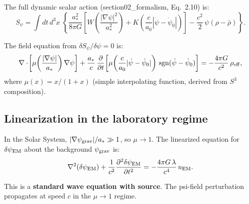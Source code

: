 \documentclass[11pt]{article}
\newcommand{\psigrav}{\psi_{\rm grav}}
\newcommand{\dpsiEM}{\delta\psi_{\rm EM}}
\theoremstyle{definition}
\theoremstyle{remark}
\begin{document}
The full dynamic scalar action (section02\_formalism, Eq.~2.10) is:
\begin{equation}
S_\psi = \int dt\,d^3x\;\left\{
  \frac{a_*^2}{8\pi G}\left[
    W\!\left(\frac{|\nabla\psi|^2}{a_*^2}\right)
    + K\!\left(\frac{c}{a_0}|\dot\psi{-}\dot\psi_0|\right)
  \right]
  - \frac{c^2}{2}\,\psi(\rho - \bar\rho)
\right\}.
\label{eq:action_full}
\end{equation}

The field equation from $\delta S_\psi/\delta\psi = 0$ is:
\begin{equation}
\nabla\cdot\!\left[\mu\!\left(\frac{|\nabla\psi|}{a_*}\right)
\nabla\psi\right]
+ \frac{a_*}{c}\,\frac{\partial}{\partial t}\!\left[
\mu\!\left(\frac{c}{a_0}|\dot\psi - \dot\psi_0|\right)
\,\mathrm{sgn}(\dot\psi - \dot\psi_0)\right]
= -\frac{4\pi G}{c^2}\,\rho_{\rm eff},
\label{eq:full_field}
\end{equation}
where $\mu(x) = x/(1+x)$ (simple interpolating function, derived from
$S^3$ composition).


\subsection{Linearization in the laboratory regime}

In the Solar System, $|\nabla\psigrav|/a_* \gg 1$, so $\mu \to 1$.
The linearized equation for $\dpsiEM$ about the background $\psigrav$ is:
\begin{equation}
\nabla^2(\dpsiEM) + \frac{1}{c^2}\frac{\partial^2\dpsiEM}{\partial t^2}
= -\frac{4\pi G\,\lambda}{c^4}\,u_{\rm EM}.
\label{eq:linearized_lab}
\end{equation}

This is a \textbf{standard wave equation with source}. The psi-field
perturbation propagates at speed $c$ in the $\mu \to 1$ regime.
\end{document}
